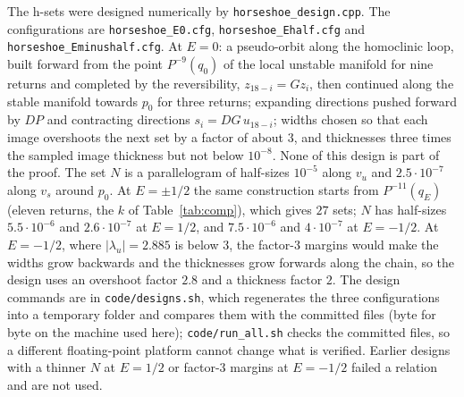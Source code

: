 \documentclass[11pt]{article}
\theoremstyle{definition}
\begin{document}
The h-sets were designed numerically by \texttt{horseshoe\_\allowbreak design.cpp}. The configurations are \texttt{horseshoe\_\allowbreak E0.cfg}, \texttt{horseshoe\_\allowbreak Ehalf.cfg} and \texttt{horseshoe\_\allowbreak Eminushalf.cfg}. At $E = 0$: a pseudo-orbit along the homoclinic loop, built forward from the point $P^{-9}(q_0)$ of the local unstable manifold for nine returns and completed by the reversibility, $z_{18-i} = Gz_i$, then continued along the stable manifold towards $p_0$ for three returns; expanding directions pushed forward by $DP$ and contracting directions $s_i = DG\,u_{18-i}$; widths chosen so that each image overshoots the next set by a factor of about $3$, and thicknesses three times the sampled image thickness but not below $10^{-8}$. None of this design is part of the proof. The set $N$ is a parallelogram of half-sizes $10^{-5}$ along $v_u$ and $2.5\cdot10^{-7}$ along $v_s$ around $p_0$. At $E = \pm1/2$ the same construction starts from $P^{-11}(q_E)$ (eleven returns, the $k$ of Table~\ref{tab:comp}), which gives $27$ sets; $N$ has half-sizes $5.5\cdot10^{-6}$ and $2.6\cdot10^{-7}$ at $E = 1/2$, and $7.5\cdot10^{-6}$ and $4\cdot10^{-7}$ at $E = -1/2$. At $E = -1/2$, where $|\lambda_u| = 2.885$ is below $3$, the factor-$3$ margins would make the widths grow backwards and the thicknesses grow forwards along the chain, so the design uses an overshoot factor $2.8$ and a thickness factor $2$. The design commands are in \texttt{code/designs.sh}, which regenerates the three configurations into a temporary folder and compares them with the committed files (byte for byte on the machine used here); \texttt{code/run\_all.sh} checks the committed files, so a different floating-point platform cannot change what is verified. Earlier designs with a thinner $N$ at $E = 1/2$ or factor-$3$ margins at $E = -1/2$ failed a relation and are not used.
\end{document}
